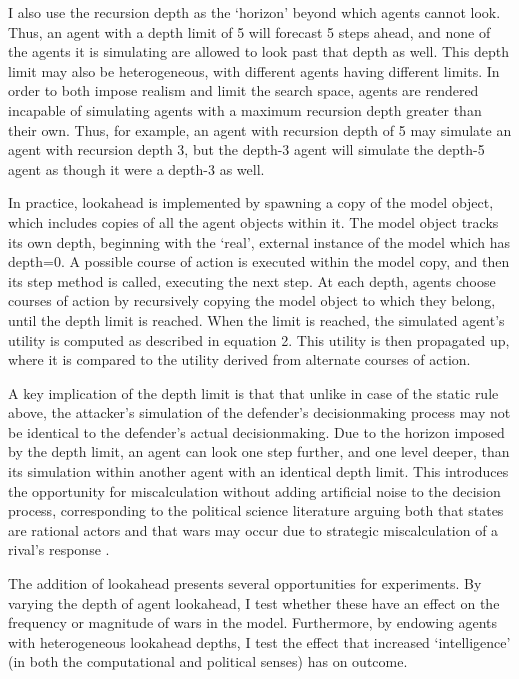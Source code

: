 \documentclass{article}
\begin{document}
I also use the recursion depth as the `horizon' beyond which agents cannot look. Thus, an agent with a depth limit of 5 will forecast 5 steps ahead, and none of the agents it is simulating are allowed to look past that depth as well. This depth limit may also be heterogeneous, with different agents having different limits. In order to both impose realism and limit the search space, agents are rendered incapable of simulating agents with a maximum recursion depth greater than their own. Thus, for example, an agent with recursion depth of 5 may simulate an agent with recursion depth 3, but the depth-3 agent will simulate the depth-5 agent as though it were a depth-3 as well.

In practice, lookahead is implemented by spawning a copy of the model object, which includes copies of all the agent objects within it. The model object tracks its own depth, beginning with the `real', external instance of the model which has depth=0. A possible course of action is executed within the model copy, and then its step method is called, executing the next step. At each depth, agents choose courses of action by recursively copying the model object to which they belong, until the depth limit is reached. When the limit is reached, the simulated agent's utility is computed as described in equation 2. This utility is then propagated up, where it is compared to the utility derived from alternate courses of action.

A key implication of the depth limit is that that unlike in case of the static rule above, the attacker's simulation of the defender's decisionmaking process may not be identical to the defender's actual decisionmaking. Due to the horizon imposed by the depth limit, an agent can look one step further, and one level deeper, than its simulation within another agent with an identical depth limit. This introduces the opportunity for miscalculation without adding artificial noise to the decision process, corresponding to the political science literature arguing both that states are rational actors and that wars may occur due to strategic miscalculation of a rival's response \citep{fearon_1995}. 

The addition of lookahead presents several opportunities for experiments. By varying the depth of agent lookahead, I test whether these have an effect on the frequency or magnitude of wars in the model. Furthermore, by endowing agents with heterogeneous lookahead depths, I test the effect that increased `intelligence' (in both the computational and political senses) has on outcome.
\end{document}
